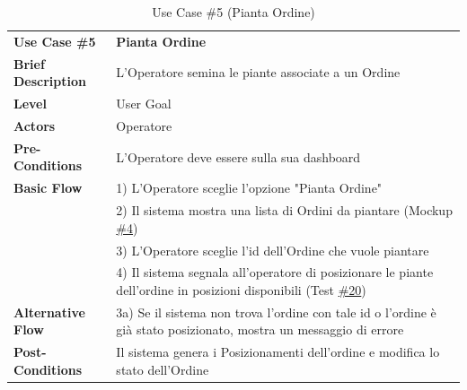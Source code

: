 \documentclass{article}
\begin{document}
    
    \begin{table}[p]
        \begin{tabularx}{\textwidth}{ | l  X | }
            \rowcolor{lightgray!70}
            \hline
            \textbf{Use Case \#5} & \textbf{Pianta Ordine }\\[0.5ex]
            \textbf{Brief Description} & L'Operatore semina le piante associate a un Ordine \\
            \rowcolor{blue!10}
            \textbf{Level} & User Goal\\
            \textbf{Actors} & Operatore \\
            \rowcolor{blue!10}
            \textbf{Pre-Conditions} & L'Operatore deve essere sulla sua dashboard\\
            \textbf{Basic Flow} & 1) L'Operatore sceglie l'opzione "Pianta Ordine"\\
            & 2) Il sistema mostra una lista di Ordini da piantare (Mockup      \hyperref[fig:mockup_4]{\#4})\\
            & 3) L'Operatore sceglie l'id dell'Ordine che vuole piantare\\
            & 4) Il sistema segnala all'operatore di posizionare le piante dell'ordine in posizioni disponibili (Test \hyperref[test_20]{\#20})\\
            \rowcolor{blue!10}
            \textbf{Alternative Flow} & 3a) Se il sistema non trova l'ordine con tale id o l'ordine è già stato posizionato, mostra un messaggio di errore\\
            \textbf{Post-Conditions} & Il sistema genera i Posizionamenti dell'ordine e modifica lo stato dell'Ordine\\
            \hline
        \end{tabularx}
        \label{use_case_5}
        \caption{Use Case \#5 (Pianta Ordine)}
    \end{table}
    
\end{document}
